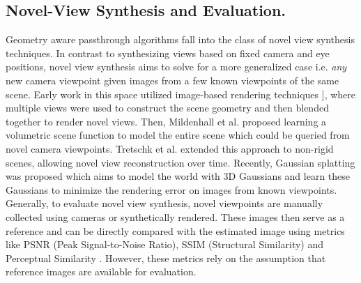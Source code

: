 \subsection{ Novel-View Synthesis and Evaluation.}
    Geometry aware passthrough algorithms fall into the class of novel view synthesis techniques. In contrast to synthesizing views based on fixed camera and eye positions, novel view synthesis aims to solve for a more generalized case i.e. \emph{any} new camera viewpoint given images from a few known viewpoints of the same scene. Early work in this space utilized image-based rendering techniques \cite{SilhouetteIBR, li2023dynibar}], where multiple views were used to construct the scene geometry and then blended together to render novel views. Then, Mildenhall et al. \cite{mildenhall2020nerf} proposed learning a volumetric scene function to model the entire scene which could be queried from novel camera viewpoints. Tretschk et al. \cite{tretschk2020nonrigid} extended this approach to non-rigid scenes, allowing novel view reconstruction over time. Recently, Gaussian splatting \cite{kerbl3Dgaussians} was proposed which aims to model the world with 3D Gaussians and learn these Gaussians to minimize the rendering error on images from known viewpoints. Generally, to evaluate novel view synthesis, novel viewpoints are manually collected using cameras or synthetically rendered. These images then serve as a reference and can be directly compared with the estimated image using metrics like PSNR (Peak Signal-to-Noise Ratio), SSIM (Structural Similarity) and Perceptual Similarity \cite{zhang2018perceptual, kerbl3Dgaussians}. However, these metrics rely on the assumption that reference images are available for evaluation.  
    
    
